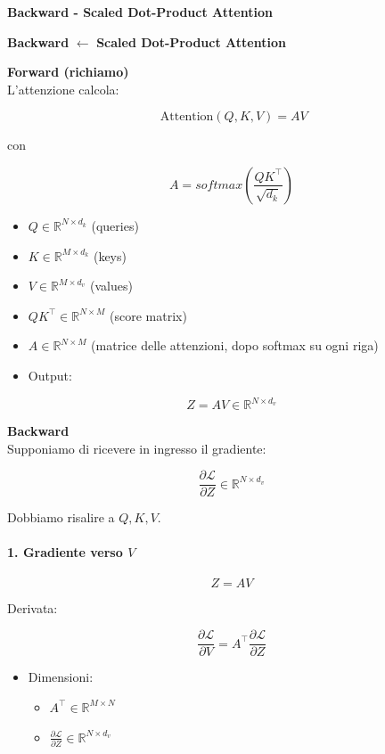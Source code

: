 \documentclass[
  11pt,
]{article}
\newcommand{\currentstep}[1]{%
\begin{tcolorbox}[colback=red!3, colframe=red!40!black, boxrule=0.3pt, arc=2pt,
  left=4pt, right=4pt, top=2pt, bottom=2pt]
{\footnotesize\textbf{Backward} $\longleftarrow$ \textbf{#1}}
\end{tcolorbox}}
\begin{document}
\textbf{Backward - Scaled Dot-Product Attention}

\currentstep{Scaled Dot-Product Attention}

\textbf{Forward (richiamo)}\\
L'attenzione calcola:

\[\text{ Attention}(Q,K,V) = AV\]

con

\[A = softmax\left( \frac{QK^{\top}}{\sqrt{d_{k}}} \right)\]

\begin{itemize}
\item
  \(Q \in \mathbb{R}^{N \times d_{k}}\) (queries)
\item
  \(K \in \mathbb{R}^{M \times d_{k}}\) (keys)
\item
  \(V \in \mathbb{R}^{M \times d_{v}}\) (values)
\item
  \(QK^{\top} \in \mathbb{R}^{N \times M}\) (score matrix)
\item
  \(A \in \mathbb{R}^{N \times M}\) (matrice delle attenzioni, dopo
  softmax su ogni riga)
\item
  Output:
\end{itemize}

\[Z = AV \in \mathbb{R}^{N \times d_{v}}\]

\textbf{Backward}\\
Supponiamo di ricevere in ingresso il gradiente:

\[\frac{\partial\mathcal{L}}{\partial Z} \in \mathbb{R}^{N \times d_{v}}\]

Dobbiamo risalire a \(Q,K,V\).

\paragraph{1. Gradiente verso $V$}

\[Z = AV\]

Derivata:


\[\frac{\partial\mathcal{L}}{\partial V} = A^{\top}\frac{\partial\mathcal{L}}{\partial Z}\]


\begin{itemize}
\item
  Dimensioni:

\begin{itemize}
  \item
    \(A^{\top} \in \mathbb{R}^{M \times N}\)
  \item
    \(\frac{\partial\mathcal{L}}{\partial Z} \in \mathbb{R}^{N \times d_{v}}\)
  \end{itemize}
\end{itemize}
\end{document}
